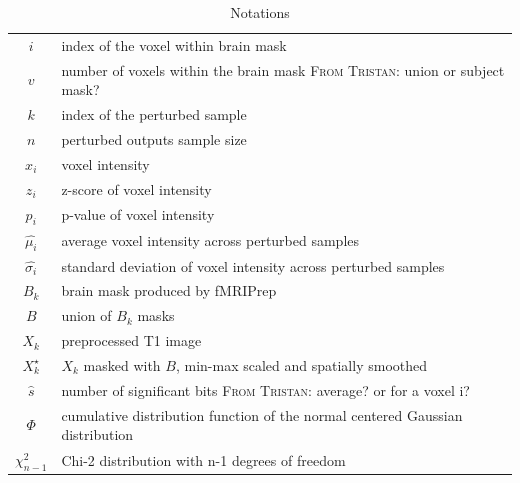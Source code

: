 \documentclass{article}
\newcommand{\TG}[1]{\color{blue}\textsc{From Tristan:} #1\color{black}\xspace}
\newcommand{\fmriprep}{fMRIPrep\xspace}
\begin{document}
\begin{table}
    \centering
    \begin{tabular}{c|l}
        $i$              & index of the voxel within brain mask                                          \\
	    $v$              & number of voxels within the brain mask \TG{union or subject mask?}                                            \\
        $k$              & index of the perturbed sample                                                 \\
        $n$              & perturbed outputs sample size                                                 \\
        $x_i$            & voxel intensity                                                               \\
        $z_i$            & z-score of voxel intensity                                                    \\
        $p_i$            & p-value of voxel intensity                                                    \\
        $\hat{\mu_i}$    & average voxel intensity across perturbed samples                               \\
        $\hat{\sigma_i}$ & standard deviation of voxel intensity across perturbed samples                 \\
        $B_k$            & brain mask produced by \fmriprep                                              \\
        $B$              & union of $B_k$ masks                                                                \\
        $X_k$            & preprocessed T1 image                                                         \\
        $X_k^{\star}$    & $X_k$ masked with $B$, min-max scaled and spatially smoothed                  \\
	    $\hat{s}$        & number of significant bits \TG{average? or for a voxel i?}                                                   \\
        $\Phi$           & cumulative distribution function of the normal centered Gaussian distribution \\
        $\chi^2_{n-1}$   & Chi-2 distribution with n-1 degrees of freedom                                \\
    \end{tabular}
    \caption{Notations}
    \label{tab:notations}
\end{table}
\end{document}
